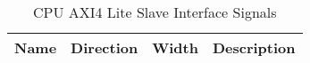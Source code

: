 \begin{table}[H]
  \centering
  \begin{tabular}{|l|l|r|p{9.5cm}|}
    
    \hline
    \rowcolor{iob-green}
    {\bf Name} & {\bf Direction} & {\bf Width} & {\bf Description}  \\ \hline \hline

    
 
  \end{tabular}
  \caption{CPU AXI4 Lite Slave Interface Signals}
  \label{axil_s_if_is_tab:is}
\end{table}

